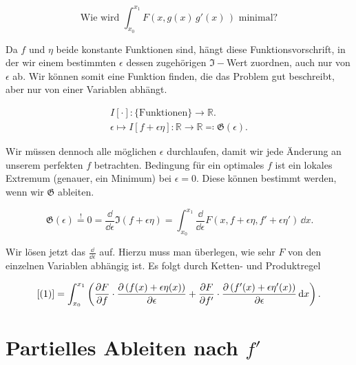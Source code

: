 \begin{equation}
 \text{Wie wird }\int_{x_0}^{x_1} F(x,g(x)\, g'(x)\,) \text{ minimal?}
\end{equation}


Da $f$ und $\eta$ beide konstante Funktionen sind, hängt diese Funktionsvorschrift, in der wir einem bestimmten $\epsilon$ dessen zugehörigen $\mathfrak{I}-$Wert zuordnen, auch nur von $\epsilon$ ab. 
Wir können somit eine Funktion finden, die das Problem gut beschreibt, aber nur von einer Variablen abhängt. 

\begin{equation}
 \begin{gathered}
  I[\cdot] \colon {\{\text{Funktionen}\}} \to \mathbb{R}.\\
 \epsilon \mapsto I[f+\epsilon \eta] \colon \mathbb{R} \to \mathbb{R} 
 \eqqcolon \mathfrak{G}(\epsilon).
 \end{gathered}
\end{equation}

Wir müssen dennoch alle möglichen $\epsilon$ durchlaufen, damit wir jede Änderung an unserem perfekten $f$ betrachten. 
Bedingung für ein optimales $f$ ist ein lokales Extremum (genauer, ein Minimum) bei $\epsilon=0$.
Diese können bestimmt werden, wenn wir $\mathfrak{G}$ ableiten.

\begin{equation}\label{(1)}
  \,\mathfrak{G}(\epsilon)\overset{!}{=}0 = \frac{\dd}{\dd\epsilon} \mathfrak{I}(f+\epsilon \eta) 
 = \int_{x_0}^{x_1} \frac{\dd}{\dd\epsilon} F(x,f+ \epsilon \eta, f'+ \epsilon \eta') \,\dd x.
\end{equation}

Wir lösen jetzt das $\frac{\dd}{\dd\epsilon}$ auf. Hierzu muss man überlegen, wie sehr $F$ von den einzelnen Variablen abhängig ist.
Es folgt durch Ketten- und Produktregel

\begin{equation}
 \ref{(1)} = \int_{x_0}^{x_1}
  \left(
  \frac{\partial F}{\partial f} \cdot \frac{\partial\left( f(x)+ \epsilon \eta(x)\right)}{\partial \epsilon} +
  \frac{\partial F}{\partial f'} \cdot \frac{\partial \left(f'(x)+\epsilon \eta'(x)\right)}{\partial \epsilon} \,\mathrm{d} x
  \right).
\end{equation}

\section{Partielles Ableiten nach $f'$}

